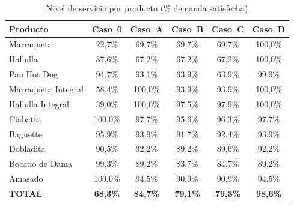 \documentclass[12pt]{article}
\begin{document}
\begin{table}[H]
\centering
\caption{Nivel de servicio por producto (\% demanda satisfecha)}
\label{tab:resultados-nds}
\renewcommand{\arraystretch}{1.3}
\begin{tabularx}{\textwidth}{Xccccc}
\toprule
\rowcolor{tabhead}
\color{white}\textbf{Producto} &
\color{white}\textbf{Caso~0} &
\color{white}\textbf{Caso~A} &
\color{white}\textbf{Caso~B} &
\color{white}\textbf{Caso~C} &
\color{white}\textbf{Caso~D} \\
\midrule
\rowcolor{tabrow}
Marraqueta &
\cellcolor{rojoriesgo!20}22,7\% &
\cellcolor{rojoriesgo!20}69,7\% &
\cellcolor{rojoriesgo!20}69,7\% &
\cellcolor{rojoriesgo!20}69,7\% &
\cellcolor{verdeok!25}100,0\% \\
Hallulla &
\cellcolor{naranja!30}87,6\% &
\cellcolor{rojoriesgo!20}67,2\% &
\cellcolor{rojoriesgo!20}67,2\% &
\cellcolor{rojoriesgo!20}67,2\% &
\cellcolor{verdeok!25}100,0\% \\
\rowcolor{tabrow}
Pan Hot Dog &
\cellcolor{naranja!30}94,7\% &
\cellcolor{naranja!30}93,1\% &
\cellcolor{rojoriesgo!20}63,9\% &
\cellcolor{rojoriesgo!20}63,9\% &
\cellcolor{verdeok!25}99,9\% \\
Marraqueta Integral &
\cellcolor{rojoriesgo!20}58,4\% &
\cellcolor{verdeok!25}100,0\% &
\cellcolor{naranja!30}93,9\% &
\cellcolor{naranja!30}93,9\% &
\cellcolor{verdeok!25}100,0\% \\
\rowcolor{tabrow}
Hallulla Integral &
\cellcolor{rojoriesgo!20}39,0\% &
\cellcolor{verdeok!25}100,0\% &
\cellcolor{verdeok!25}97,5\% &
\cellcolor{verdeok!25}97,9\% &
\cellcolor{verdeok!25}100,0\% \\
Ciabatta &
\cellcolor{verdeok!25}100,0\% &
\cellcolor{verdeok!25}97,7\% &
\cellcolor{verdeok!25}95,6\% &
\cellcolor{verdeok!25}96,3\% &
\cellcolor{verdeok!25}97,7\% \\
\rowcolor{tabrow}
Baguette &
\cellcolor{verdeok!25}95,9\% &
\cellcolor{naranja!30}93,9\% &
\cellcolor{naranja!30}91,7\% &
\cellcolor{naranja!30}92,4\% &
\cellcolor{naranja!30}93,9\% \\
Dobladita &
\cellcolor{naranja!30}90,5\% &
\cellcolor{naranja!30}92,2\% &
\cellcolor{naranja!30}89,2\% &
\cellcolor{naranja!30}89,6\% &
\cellcolor{naranja!30}92,2\% \\
\rowcolor{tabrow}
Bocado de Dama &
\cellcolor{verdeok!25}99,3\% &
\cellcolor{naranja!30}89,2\% &
\cellcolor{rojoriesgo!20}83,7\% &
\cellcolor{rojoriesgo!20}84,7\% &
\cellcolor{naranja!30}89,2\% \\
Amasado &
\cellcolor{verdeok!25}100,0\% &
\cellcolor{naranja!30}94,5\% &
\cellcolor{naranja!30}90,9\% &
\cellcolor{naranja!30}90,9\% &
\cellcolor{naranja!30}94,5\% \\
\midrule
\rowcolor{tabrow}
\textbf{TOTAL} &
\cellcolor{rojoriesgo!20}\textbf{68,3\%} &
\cellcolor{rojoriesgo!20}\textbf{84,7\%} &
\cellcolor{rojoriesgo!20}\textbf{79,1\%} &
\cellcolor{rojoriesgo!20}\textbf{79,3\%} &
\cellcolor{verdeok!25}\textbf{98,6\%} \\
\bottomrule
\end{tabularx}
\end{table}
\end{document}
